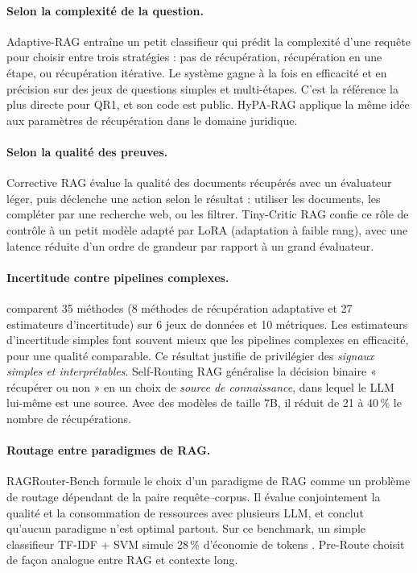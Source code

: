 \documentclass[11pt,a4paper]{article}
\begin{document}
\paragraph{Selon la complexité de la question.} Adaptive-RAG \citep{jeong2024adaptiverag} entraîne un
petit classifieur qui prédit la complexité d'une requête pour choisir entre trois stratégies : pas de
récupération, récupération en une étape, ou récupération itérative. Le système gagne à la fois en
efficacité et en précision sur des jeux de questions simples et multi-étapes. C'est la référence la
plus directe pour QR1, et son code est public. HyPA-RAG \citep{kalra2024hyparag} applique la même
idée aux paramètres de récupération dans le domaine juridique.

\paragraph{Selon la qualité des preuves.} Corrective RAG \citep{yan2024crag} évalue la qualité des
documents récupérés avec un évaluateur léger, puis déclenche une action selon le résultat : utiliser les
documents, les compléter par une recherche web, ou les filtrer. Tiny-Critic RAG \citep{wu2026tinycritic}
confie ce rôle de contrôle à un petit modèle adapté par LoRA (adaptation à faible rang), avec une latence
réduite d'un ordre de grandeur par rapport à un grand évaluateur.

\paragraph{Incertitude contre pipelines complexes.} \citet{moskvoretskii2025adaptive} comparent
35 méthodes (8 méthodes de récupération adaptative et 27 estimateurs d'incertitude) sur 6 jeux de
données et 10 métriques. Les estimateurs d'incertitude simples font souvent mieux que les pipelines
complexes en efficacité, pour une qualité comparable. Ce résultat justifie de privilégier des
\emph{signaux simples et interprétables}. Self-Routing RAG \citep{wu2025srrag} généralise la décision
binaire « récupérer ou non » en un choix de \emph{source de connaissance}, dans lequel le LLM lui-même
est une source. Avec des modèles de taille 7B, il réduit de 21 à 40\,\% le nombre de récupérations.

\paragraph{Routage entre paradigmes de RAG.} RAGRouter-Bench \citep{wang2026ragrouterbench} formule le
choix d'un paradigme de RAG comme un problème de routage dépendant de la paire requête--corpus. Il
évalue conjointement la qualité et la consommation de ressources avec plusieurs LLM, et conclut
qu'aucun paradigme n'est optimal partout. Sur ce benchmark, un simple classifieur TF-IDF + SVM simule
28\,\% d'économie de tokens \citep{bansal2026lightweight}. Pre-Route \citep{chen2026preroute} choisit de
façon analogue entre RAG et contexte long.
\end{document}
